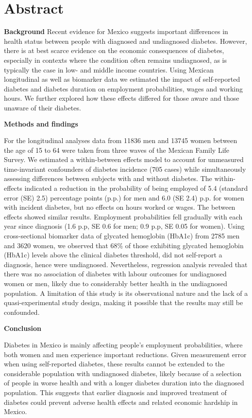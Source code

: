 \documentclass[10pt,letterpaper]{article}
\newcommand{\absdiv}[1]{%
	\par%
	\noindent\textbf{#1}\quad\ignorespaces
}
\begin{document}
\section*{Abstract}
\absdiv{Background} Recent evidence for Mexico suggests important differences in health status between people with diagnosed and undiagnosed diabetes. However, there is at best scarce evidence on the economic consequences of diabetes, especially in contexts where the condition often remains undiagnosed, as is typically the case in low- and middle income countries. Using Mexican longitudinal as well as biomarker data we estimated the impact of self-reported diabetes and diabetes duration on employment probabilities, wages and working hours. We further explored how these effects differed for those aware and those unaware of their diabetes. 
\absdiv{Methods and findings}
For the longitudinal analyses data from 11836 men and 13745 women between the age of 15 to 64 were taken from three waves of the Mexican Family Life Survey. We estimated a within-between effects model to account for unmeasured time-invariant confounders of diabetes incidence (705 cases) while simultaneously assessing differences between subjects with and without diabetes. The within-effects indicated a reduction in the probability of being employed of 5.4 (standard error (SE) 2.5) percentage points (p.p.) for men and 6.0 (SE 2.4) p.p. for women with incident diabetes,  but no effects on hours worked or wages. The between effects showed similar results. Employment probabilities fell gradually with each year since diagnosis (1.6 p.p, SE 0.6 for men; 0.9 p.p, SE 0.05 for women). Using cross-sectional biomarker data of glycated hemoglobin (HbA1c) from 2785 men and 3620 women, we observed that 68\% of those exhibiting glycated hemoglobin (HbA1c) levels above the clinical diabetes threshold, did not self-report a diagnosis, hence were undiagnosed. Nevertheless, regression analysis revealed that there was no association of diabetes with labour outcomes for undiagnosed women or men, likely due to considerably better health in the undiagnosed population. A limitation of this study is its observational nature and the lack of a quasi-experimental study design, making it possible that the results may still be confounded.
\absdiv{Conclusion}
Diabetes in Mexico is mainly affecting people's employment probabilities, where both women and men experience important reductions. Given measurement error when using self-reported diabetes, these results cannot be extended to the considerable population with undiagnosed diabetes, likely because of a selection of people in worse health and with a longer diabetes duration into the diagnosed population. This suggests that earlier diagnosis and improved treatment of diabetes could prevent adverse health effects and related economic hardship in Mexico.
\end{document}
